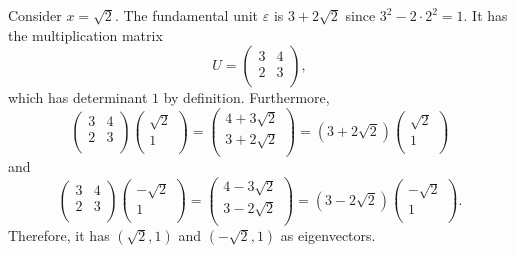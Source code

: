 \begin{example}
  \label{ex:sqrt2-unit}
  Consider $x = \sqrt{2}$.
  The fundamental unit $ε$ is $3 + 2\sqrt{2}$ since $3^2 - 2 · 2^2 = 1$.
  It has the multiplication matrix
  \[
    U = \begin{pmatrix}
      3 & 4 \\
      2 & 3 \\
    \end{pmatrix},
  \]
  which has determinant $1$ by definition.
  Furthermore,
  \[
    \begin{pmatrix}
      3 & 4 \\
      2 & 3 \\
    \end{pmatrix}
    \begin{pmatrix}
      \sqrt{2} \\ 1 \\
    \end{pmatrix}
    =
    \begin{pmatrix}
      4 + 3\sqrt{2} \\
      3 + 2\sqrt{2} \\
    \end{pmatrix}
    =
    (3 + 2\sqrt{2})
    \begin{pmatrix}
      \sqrt{2} \\ 1 \\
    \end{pmatrix}
  \]
  and
  \[
    \begin{pmatrix}
      3 & 4 \\
      2 & 3 \\
    \end{pmatrix}
    \begin{pmatrix}
      -\sqrt{2} \\ 1 \\
    \end{pmatrix}
    =
    \begin{pmatrix}
      4 - 3\sqrt{2} \\
      3 - 2\sqrt{2} \\
    \end{pmatrix}
    =
    (3 - 2\sqrt{2})
    \begin{pmatrix}
      -\sqrt{2} \\ 1 \\
    \end{pmatrix}.
  \]
  Therefore, it has $(\sqrt{2}, 1)$ and $(-\sqrt{2}, 1)$ as eigenvectors.
\end{example}

